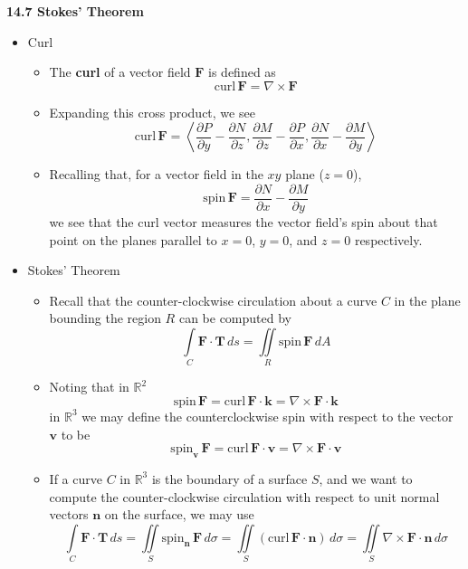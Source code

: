 \documentclass[12pt]{article}
\theoremstyle{plain}
\theoremstyle{definition}
\theoremstyle{remark}
\newcommand{\vect}[1]{\mathbf{#1}}
\newcommand{\veck}{\mathbf{k}}
\begin{document}
	\newpage
	
	\centerline{\bf 14.7 Stokes' Theorem}
	
	\begin{itemize}
		
	\item Curl
		\begin{itemize}
		\item The \textbf{curl} of a vector field $\vect{F}$ is defined as \[\textrm{curl}\,\vect{F} = \nabla \times \vect{F}\]
		\item Expanding this cross product, we see \[\textrm{curl}\,\vect{F} = \left<\frac{\partial P}{\partial y}-\frac{\partial N}{\partial z},\frac{\partial M}{\partial z}-\frac{\partial P}{\partial x},\frac{\partial N}{\partial x}-\frac{\partial M}{\partial y}\right>\]
		\item Recalling that, for a vector field in the $xy$ plane ($z=0$), \[\textrm{spin}\,\vect{F} = \frac{\partial N}{\partial x}-\frac{\partial M}{\partial y}\] we see that the curl vector measures the vector field's spin about that point on the planes parallel to $x=0$, $y=0$, and $z=0$ respectively.
		\end{itemize}
	
	\item Stokes' Theorem
	
		\begin{itemize}
		\item Recall that the counter-clockwise circulation about a curve $C$ in the plane bounding the region $R$ can be computed by \[\int\limits_C \vect{F}\cdot\vect{T}\,ds = \iint\limits_R \textrm{spin}\,\vect{F}\,dA\]
		\item Noting that in $\mathbb{R}^2$ \[\textrm{spin}\,\vect{F} = \textrm{curl}\,\vect{F}\cdot \veck = \nabla \times \vect{F} \cdot \veck\] in $\mathbb{R}^3$ we may define the counterclockwise spin with respect to the vector $\vect{v}$ to be \[\textrm{spin}_{\vect{v}}\,\vect{F} = \textrm{curl}\,\vect{F} \cdot \vect{v} = \nabla \times \vect{F} \cdot \vect{v}\]
		\item If a curve $C$ in $\mathbb{R}^3$ is the boundary of a surface $S$, and we want to compute the counter-clockwise circulation with respect to unit normal vectors $\vect{n}$ on the surface, we may use \[\int\limits_C \vect{F}\cdot\vect{T}\,ds = \iint\limits_S \textrm{spin}_{\vect{n}}\,\vect{F}\,d\sigma = \iint\limits_S (\textrm{curl}\,\vect{F} \cdot \vect{n})\,d\sigma = \iint\limits_S \nabla \times \vect{F} \cdot \vect{n}\,d\sigma\] 
		\end{itemize}
		

\end{itemize}
\end{document}
